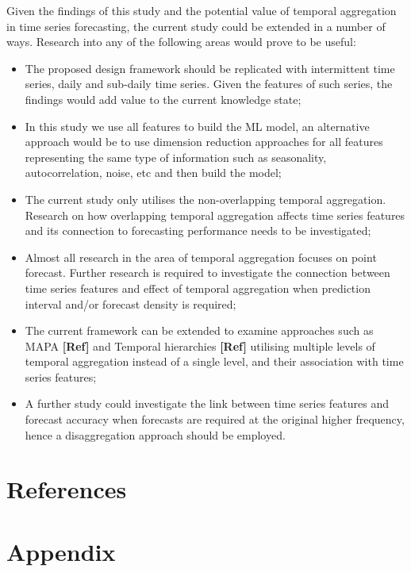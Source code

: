 \documentclass[preprint, 3p,
authoryear]{elsarticle} %
\begin{document}
Given the findings of this study and the potential value of temporal
aggregation in time series forecasting, the current study could be
extended in a number of ways. Research into any of the following areas
would prove to be useful:

\begin{itemize}
\item
  The proposed design framework should be replicated with intermittent
  time series, daily and sub-daily time series. Given the features of
  such series, the findings would add value to the current knowledge
  state;
\item
  In this study we use all features to build the ML model, an
  alternative approach would be to use dimension reduction approaches
  for all features representing the same type of information such as
  seasonality, autocorrelation, noise, etc and then build the model;
\item
  The current study only utilises the non-overlapping temporal
  aggregation. Research on how overlapping temporal aggregation affects
  time series features and its connection to forecasting performance
  needs to be investigated;
\item
  Almost all research in the area of temporal aggregation focuses on
  point forecast. Further research is required to investigate the
  connection between time series features and effect of temporal
  aggregation when prediction interval and/or forecast density is
  required;
\item
  The current framework can be extended to examine approaches such as
  MAPA \textbf{{[}Ref{]}} and Temporal hierarchies \textbf{{[}Ref{]}}
  utilising multiple levels of temporal aggregation instead of a single
  level, and their association with time series features;
\item
  A further study could investigate the link between time series
  features and forecast accuracy when forecasts are required at the
  original higher frequency, hence a disaggregation approach should be
  employed.
\end{itemize}

\hypertarget{references}{%
\section*{References}\label{references}}

\hypertarget{appendix}{%
\section*{Appendix}\label{appendix}}
\end{document}
